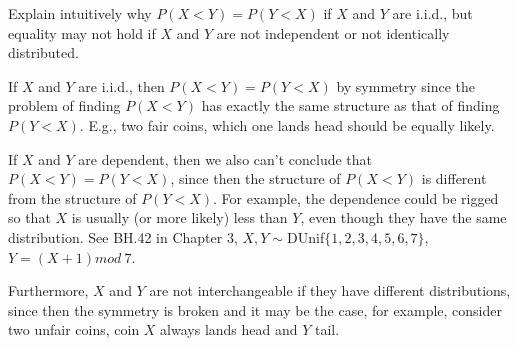

\setcounter{theorem}{49}
\begin{exercise}[BH.5.50] Explain intuitively why $P(X<Y)=P(Y<X)$ if $X$ and $Y$ are i.i.d., but equality may not hold if $X$ and $Y$ are not independent or not identically distributed.
\begin{solution}
    If $X$ and $Y$ are i.i.d., then $P(X<Y)=P(Y<X)$ by symmetry since the problem of finding $P(X < Y )$ has exactly the same structure as that of finding $P(Y < X)$. E.g., two fair coins, which one lands head should be equally likely.

	If $X$ and $Y$ are dependent, then we also can't conclude that $P(X<Y)=P(Y<X)$, since then the structure of $P(X<Y)$ is different from the structure of $P(Y<X)$. For example, the dependence could be rigged so that $X$ is usually (or more likely) less than $Y$, even though they have the same distribution. See BH.42 in Chapter 3, $X,Y\sim$DUnif$\{1,2,3,4,5,6,7\}$, $Y=(X+1) \textit{mod} ~7$.  
	
	Furthermore,  $X$ and $Y$ are not interchangeable if they have different distributions, since then the symmetry is broken and it may be the case, for example, consider two unfair coins, coin $X$ always lands head and $Y$ tail.
\end{solution}
\end{exercise}


